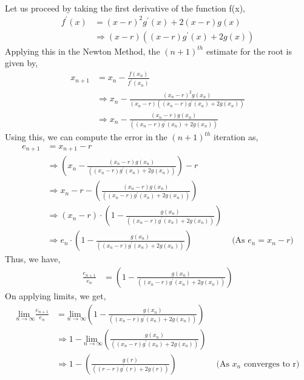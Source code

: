 \documentclass[letterpaper]{exam}
\begin{document}
\begin{questions}
\begin{solution}
\\
Let us proceed by taking the first derivative of the function f(x),
\begin{align*}
    f^{'} (x) &= (x-r)^2g^{'}(x) + 2(x-r)g(x)\\
    &\Rightarrow
    (x-r)\left((x-r)g^{'}(x) + 2g(x)\right)
\end{align*}
Applying this in the Newton Method, the $(n+1)^{th}$ estimate for the root is given by,
\begin{align*}
    x_{n+1} &= x_{n} - \frac{f(x_n)}{f^{'}(x_n)}\\
    &\Rightarrow
    x_n - \frac{(x_n − r)^2g(x_n)}{(x_n-r)\left((x_n-r)g^{'}(x_n) + 2g(x_n)\right)}\\
    &\Rightarrow
    x_n - \frac{(x_n − r)g(x_n)}{\left((x_n-r)g^{'}(x_n) + 2g(x_n)\right)}
\end{align*}
Using this, we can compute the error in the $(n+1)^{th}$ iteration as,
\begin{align*}
    e_{n+1} &= x_{n+1} - r\\
    &\Rightarrow 
    \left(x_n - \frac{(x_n − r)g(x_n)}{\left((x_n-r)g^{'}(x_n) + 2g(x_n)\right)}\right) - r\\
    &\Rightarrow
    x_n - r - \left(\frac{(x_n − r)g(x_n)}{\left((x_n-r)g^{'}(x_n) + 2g(x_n)\right)}\right)\\
    &\Rightarrow
    (x_n-r)\cdot \left(1 - \frac{g(x_n)}{\left((x_n-r)g^{'}(x_n) + 2g(x_n)\right)} \right)\\
    &\Rightarrow
    e_n \cdot \left(1 - \frac{g(x_n)}{\left((x_n-r)g^{'}(x_n) + 2g(x_n)\right)} \right) &\mbox{ (As $e_n = x_n - r$)}
\end{align*}
Thus, we have,
\begin{align*}
    \frac{e_{n+1}}{e_{n}} &= \left(1 - \frac{g(x_n)}{\left((x_n-r)g^{'}(x_n) + 2g(x_n)\right)} \right)
\end{align*}
On applying limits, we get,
\begin{align*}
    \underset{n \rightarrow \infty}{\text{lim } } \frac{e_{n+1}}{e_{n}} &=  \underset{n \rightarrow \infty}{\text{lim } } \left(1 - \frac{g(x_n)}{\left((x_n-r)g^{'}(x_n) + 2g(x_n)\right)} \right)\\
    &\Rightarrow
    1 - \underset{n \rightarrow \infty}{\text{lim } } \left( \frac{g(x_n)}{\left((x_n-r)g^{'}(x_n) + 2g(x_n)\right)} \right)\\
    &\Rightarrow
    1 - \left( \frac{g(r)}{\left((r-r)g^{'}(r) + 2g(r)\right)} \right) &\mbox{ (As $x_n$ converges to r)}\\

\end{align*}
\end{solution}
\end{questions}
\end{document}
